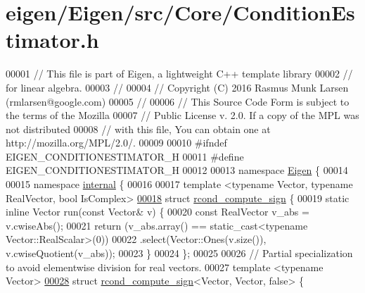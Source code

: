 \hypertarget{eigen_2_eigen_2src_2_core_2_condition_estimator_8h_source}{}\section{eigen/\+Eigen/src/\+Core/\+Condition\+Estimator.h}
\label{eigen_2_eigen_2src_2_core_2_condition_estimator_8h_source}

\begin{DoxyCode}
00001 \textcolor{comment}{// This file is part of Eigen, a lightweight C++ template library}
00002 \textcolor{comment}{// for linear algebra.}
00003 \textcolor{comment}{//}
00004 \textcolor{comment}{// Copyright (C) 2016 Rasmus Munk Larsen (rmlarsen@google.com)}
00005 \textcolor{comment}{//}
00006 \textcolor{comment}{// This Source Code Form is subject to the terms of the Mozilla}
00007 \textcolor{comment}{// Public License v. 2.0. If a copy of the MPL was not distributed}
00008 \textcolor{comment}{// with this file, You can obtain one at http://mozilla.org/MPL/2.0/.}
00009 
00010 \textcolor{preprocessor}{#ifndef EIGEN\_CONDITIONESTIMATOR\_H}
00011 \textcolor{preprocessor}{#define EIGEN\_CONDITIONESTIMATOR\_H}
00012 
00013 \textcolor{keyword}{namespace }\hyperlink{namespace_eigen}{Eigen} \{
00014 
00015 \textcolor{keyword}{namespace }\hyperlink{namespaceinternal}{internal} \{
00016 
00017 \textcolor{keyword}{template} <\textcolor{keyword}{typename} Vector, \textcolor{keyword}{typename} RealVector, \textcolor{keywordtype}{bool} IsComplex>
\hyperlink{struct_eigen_1_1internal_1_1rcond__compute__sign}{00018} \textcolor{keyword}{struct }\hyperlink{struct_eigen_1_1internal_1_1rcond__compute__sign}{rcond\_compute\_sign} \{
00019   \textcolor{keyword}{static} \textcolor{keyword}{inline} Vector run(\textcolor{keyword}{const} Vector& v) \{
00020     \textcolor{keyword}{const} RealVector v\_abs = v.cwiseAbs();
00021     \textcolor{keywordflow}{return} (v\_abs.array() == \textcolor{keyword}{static\_cast<}typename Vector::RealScalar\textcolor{keyword}{>}(0))
00022             .select(Vector::Ones(v.size()), v.cwiseQuotient(v\_abs));
00023   \}
00024 \};
00025 
00026 \textcolor{comment}{// Partial specialization to avoid elementwise division for real vectors.}
00027 \textcolor{keyword}{template} <\textcolor{keyword}{typename} Vector>
\hyperlink{struct_eigen_1_1internal_1_1rcond__compute__sign_3_01_vector_00_01_vector_00_01false_01_4}{00028} \textcolor{keyword}{struct }\hyperlink{struct_eigen_1_1internal_1_1rcond__compute__sign}{rcond\_compute\_sign}<Vector, Vector, false> \{

\end{DoxyCode}
